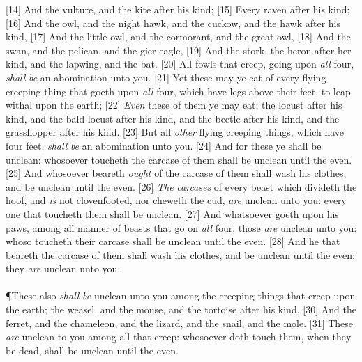 [14] \textcolor[cmyk]{0.99998,1,0,0}{And the vulture, and the kite after his kind;}
[15] \textcolor[cmyk]{0.99998,1,0,0}{Every raven after his kind;}
[16] \textcolor[cmyk]{0.99998,1,0,0}{And the owl, and the night hawk, and the cuckow, and the hawk after his kind,}
[17] \textcolor[cmyk]{0.99998,1,0,0}{And the little owl, and the cormorant, and the great owl,}
[18] \textcolor[cmyk]{0.99998,1,0,0}{And the swan, and the pelican, and the gier eagle,}
[19] \textcolor[cmyk]{0.99998,1,0,0}{And the stork, the heron after her kind, and the lapwing, and the bat.}
[20] \textcolor[cmyk]{0.99998,1,0,0}{All fowls that creep, going upon \emph{all} four, \emph{shall} \emph{be} an abomination unto you.}
[21] \textcolor[cmyk]{0.99998,1,0,0}{Yet these may ye eat of every flying creeping thing that goeth upon \emph{all} four, which have legs above their feet, to leap withal upon the earth;}
[22] \textcolor[cmyk]{0.99998,1,0,0}{\emph{Even} these of them ye may eat; the locust after his kind, and the bald locust after his kind, and the beetle after his kind, and the grasshopper after his kind.}
[23] \textcolor[cmyk]{0.99998,1,0,0}{But all \emph{other} flying creeping things, which have four feet, \emph{shall} \emph{be} an abomination unto you.}
[24] \textcolor[cmyk]{0.99998,1,0,0}{And for these ye shall be unclean: whosoever toucheth the carcase of them shall be unclean until the even.}
[25] \textcolor[cmyk]{0.99998,1,0,0}{And whosoever beareth \emph{ought} of the carcase of them shall wash his clothes, and be unclean until the even.}
[26] \textcolor[cmyk]{0.99998,1,0,0}{\emph{The} \emph{carcases} of every beast which divideth the hoof, and \emph{is} not clovenfooted, nor cheweth the cud, \emph{are} unclean unto you: every one that toucheth them shall be unclean.}
[27] \textcolor[cmyk]{0.99998,1,0,0}{And whatsoever goeth upon his paws, among all manner of beasts that go on \emph{all} four, those \emph{are} unclean unto you: whoso toucheth their carcase shall be unclean until the even.}
[28] \textcolor[cmyk]{0.99998,1,0,0}{And he that beareth the carcase of them shall wash his clothes, and be unclean until the even: they \emph{are} unclean unto you.}\\
\\
\P \textcolor[cmyk]{0.99998,1,0,0}{These also \emph{shall} \emph{be} unclean unto you among the creeping things that creep upon the earth; the weasel, and the mouse, and the tortoise after his kind,}
[30] \textcolor[cmyk]{0.99998,1,0,0}{And the ferret, and the chameleon, and the lizard, and the snail, and the mole.}
[31] \textcolor[cmyk]{0.99998,1,0,0}{These \emph{are} unclean to you among all that creep: whosoever doth touch them, when they be dead, shall be unclean until the even.}

